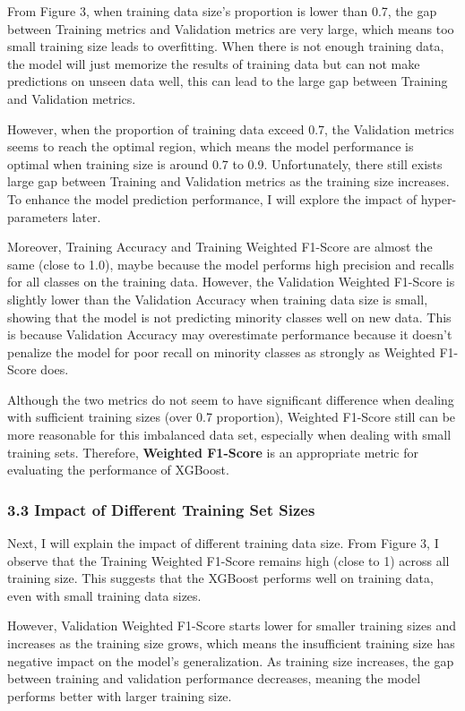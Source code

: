 \documentclass[
]{article}
\begin{document}
From Figure 3, when training data size's proportion is lower than 0.7,
the gap between Training metrics and Validation metrics are very large,
which means too small training size leads to overfitting. When there is
not enough training data, the model will just memorize the results of
training data but can not make predictions on unseen data well, this can
lead to the large gap between Training and Validation metrics.

However, when the proportion of training data exceed 0.7, the Validation
metrics seems to reach the optimal region, which means the model
performance is optimal when training size is around 0.7 to 0.9.
Unfortunately, there still exists large gap between Training and
Validation metrics as the training size increases. To enhance the model
prediction performance, I will explore the impact of hyper-parameters
later.

Moreover, Training Accuracy and Training Weighted F1-Score are almost
the same (close to 1.0), maybe because the model performs high precision
and recalls for all classes on the training data. However, the
Validation Weighted F1-Score is slightly lower than the Validation
Accuracy when training data size is small, showing that the model is not
predicting minority classes well on new data. This is because Validation
Accuracy may overestimate performance because it doesn't penalize the
model for poor recall on minority classes as strongly as Weighted
F1-Score does.

Although the two metrics do not seem to have significant difference when
dealing with sufficient training sizes (over 0.7 proportion), Weighted
F1-Score still can be more reasonable for this imbalanced data set,
especially when dealing with small training sets. Therefore,
\textbf{Weighted F1-Score} is an appropriate metric for evaluating the
performance of XGBoost.

\subsubsection{3.3 Impact of Different Training Set
Sizes}\label{impact-of-different-training-set-sizes}

Next, I will explain the impact of different training data size. From
Figure 3, I observe that the Training Weighted F1-Score remains high
(close to 1) across all training size. This suggests that the XGBoost
performs well on training data, even with small training data sizes.

However, Validation Weighted F1-Score starts lower for smaller training
sizes and increases as the training size grows, which means the
insufficient training size has negative impact on the model's
generalization. As training size increases, the gap between training and
validation performance decreases, meaning the model performs better with
larger training size.
\end{document}
